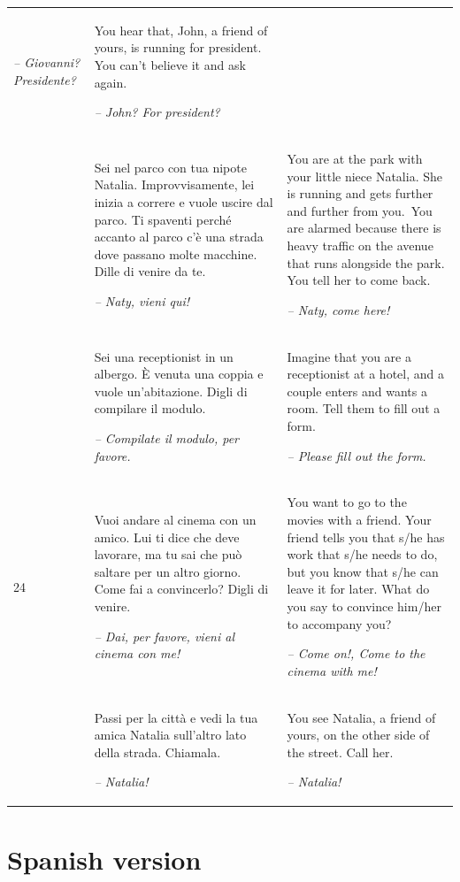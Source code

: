 \begin{xltabular}{\textwidth}{lQQ}
\textit{-- Giovanni? Presidente?} & You hear that, John, a friend of yours, is running for president. You can’t believe it and ask again.

{\itshape -- John? For president?}\\
 & Sei nel parco con tua nipote Natalia. Improvvisamente, lei inizia a correre e vuole uscire dal parco. Ti spaventi perché accanto al parco c'è una strada dove passano molte macchine. Dille di venire da te.

{\itshape -- Naty, vieni qui!} & You are at the park with your little niece Natalia. She is running and gets further and further from you.~You are alarmed because there is heavy traffic on the avenue that runs alongside the park. You tell her to come back.

{\itshape -- Naty, come here!}\\
 & Sei una receptionist in un albergo. È venuta una coppia e vuole un’abitazione. Digli di compilare il modulo.

{\itshape -- Compilate il modulo, per favore.} & Imagine that you are a receptionist at a hotel, and a couple enters and wants a room. Tell them to fill out a form.

{\itshape -- Please fill out the form.}\\
24 & Vuoi andare al cinema con un amico. Lui ti dice che deve lavorare, ma tu sai che può saltare per un altro giorno. Come fai a convincerlo? Digli di venire.

{\itshape -- Dai, per favore, vieni al cinema con me!} & You want to go to the movies with a friend. Your friend tells you that s/he has work that s/he needs to do, but you know that s/he can leave it for later. What do you say to convince him/her to accompany you?

{\itshape -- Come on!, Come to the cinema with me!}\\
 & Passi per la città e vedi la tua amica Natalia sull'altro lato della strada. Chiamala.

\textit{-- Natalia!} & You see Natalia, a friend of yours, on the other side of the street. Call her.

\textit{-- Natalia!}\\
\end{xltabular}




\section{Spanish version}\label{app:a2}




